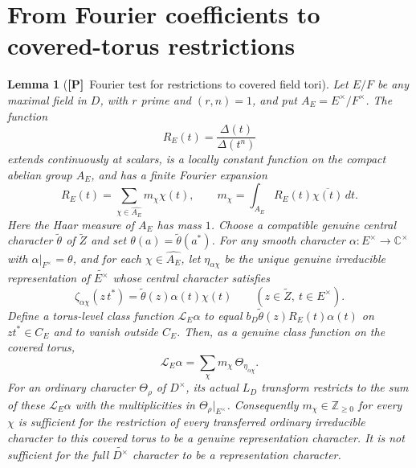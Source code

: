 \documentclass[11pt]{article}
\newcommand{\tth}{\widetilde\theta}
\newcommand{\Ptag}{\textnormal{\textbf{[P]}}}
\theoremstyle{plain}
\newtheorem{lemma}[theorem]{Lemma}
\theoremstyle{definition}
\begin{document}
\section{From Fourier coefficients to covered-torus restrictions}\label{sec:fourier}
\begin{lemma}[\Ptag\ Fourier test for restrictions to covered field tori]\label{lem:toral-Fourier}
Let $E/F$ be any maximal field in $D$, with $r$ prime and
$(r,n)=1$, and put $A_E=E^\times/F^\times$.  The function
\[
 R_E(t)=\frac{\Delta(t)}{\Delta(t^n)}
\]
extends continuously at scalars, is a locally constant function
on the compact abelian group $A_E$, and has a finite Fourier expansion
\begin{equation}\label{eq:R-Fourier}
 R_E(t)=\sum_{\chi\in\widehat{A_E}}m_\chi\chi(t),
 \qquad
 m_\chi=\int_{A_E}R_E(t)\overline{\chi(t)}\,dt.
\end{equation}
Here the Haar measure of $A_E$ has mass $1$.
Choose a compatible genuine central character
$\tth$ of $\widetilde Z$ and set
$\theta(a)=\tth(a^*)$.  For any smooth character
$\alpha:E^\times\to\mathbb C^\times$ with
$\alpha|_{F^\times}=\theta$, and for each $\chi\in\widehat{A_E}$,
let $\eta_{\alpha\chi}$ be the unique genuine irreducible
representation of $\widetilde{E^\times}$ whose central character
satisfies
\[
 \zeta_{\alpha\chi}(z\,t^*)=
 \tth(z)\alpha(t)\chi(t)
 \qquad(z\in\widetilde Z,\ t\in E^\times).
\]
Define a torus-level class function $\mathcal L_E\alpha$ to equal
$b_D\tth(z)R_E(t)\alpha(t)$ on $z t^*\in C_E$
and to vanish outside $C_E$.  Then, as a genuine class function
on the \emph{covered torus},
\begin{equation}\label{eq:toral-branch}
 \mathcal L_E\alpha
 =\sum_\chi m_\chi\,\Theta_{\eta_{\alpha\chi}}.
\end{equation}
For an ordinary character $\Theta_\rho$ of $D^\times$,
its actual $L_D$ transform restricts to the sum of these
$\mathcal L_E\alpha$ with the multiplicities in
$\Theta_\rho|_{E^\times}$.
Consequently $m_\chi\in\mathbb Z_{\geq0}$ for every $\chi$
is sufficient for the restriction of every transferred ordinary
irreducible character to this covered torus to be a genuine
representation character.  It is not sufficient for the full
$\widetilde{D^\times}$ character to be a representation character.
\end{lemma}
\end{document}
